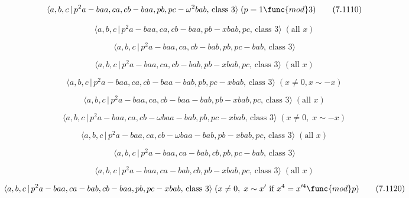 \documentclass[10pt]{article}
\begin{document}
\begin{equation}
\langle a,b,c\,|\,p^{2}a-baa,ca,cb-baa,pb,pc-\omega ^{2}bab,\,\text{class }%
3\rangle \;(p=1\func{mod}3)  \tag{7.1110}
\end{equation}

\begin{equation}
\langle a,b,c\,|\,p^2a-baa,ca,cb-baa,pb-xbab,pc,\,\text{class }3\rangle \;(%
\text{all }x)  \tag{7.1111}
\end{equation}

\begin{equation}
\langle a,b,c\,|\,p^2a-baa,ca,cb-bab,pb,pc-bab,\,\text{class }3\rangle 
\tag{7.1112}
\end{equation}

\begin{equation}
\langle a,b,c\,|\,p^2a-baa,ca,cb-bab,pb-xbab,pc,\,\text{class }3\rangle \;(%
\text{all }x)  \tag{7.1113}
\end{equation}

\begin{equation}
\langle a,b,c\,|\,p^2a-baa,ca,cb-baa-bab,pb,pc-xbab,\,\text{class }3\rangle
\;(x \neq 0, x \sim -x)  \tag{7.1114}
\end{equation}

\begin{equation}
\langle a,b,c\,|\,p^2a-baa,ca,cb-baa-bab,pb-xbab,pc,\,\text{class }3\rangle
\;(\text{all }x)  \tag{7.1115}
\end{equation}

\begin{equation}
\langle a,b,c\,|\,p^{2}a-baa,ca,cb-\omega baa-bab,pb,pc-xbab,\,\text{class }%
3\rangle \;(x\neq 0,\;x\sim -x)  \tag{7.1116}
\end{equation}

\begin{equation}
\langle a,b,c\,|\,p^{2}a-baa,ca,cb-\omega baa-bab,pb-xbab,pc,\,\text{class }%
3\rangle \;(\text{all }x)  \tag{7.1117}
\end{equation}

\begin{equation}
\langle a,b,c\,|\,p^2a-baa,ca-bab,cb,pb,pc-bab,\,\text{class }3\rangle 
\tag{7.1118}
\end{equation}

\begin{equation}
\langle a,b,c\,|\,p^2a-baa,ca-bab,cb,pb-xbab,pc,\,\text{class }3\rangle \;(%
\text{all }x)  \tag{7.1119}
\end{equation}

\begin{equation}
\langle a,b,c\,|\,p^{2}a-baa,ca-bab,cb-baa,pb,pc-xbab,\,\text{class }%
3\rangle \;(x\neq 0,\;x\sim x^{\prime }\text{ if }x^{4}=x^{\prime 4}\func{mod%
}p)  \tag{7.1120}
\end{equation}
\end{document}
